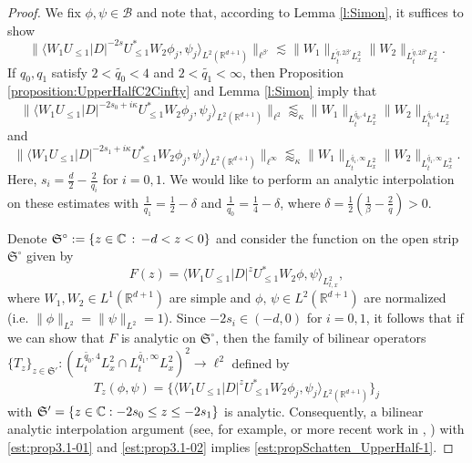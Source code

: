 \documentclass[a4paper]{amsart}
\numberwithin{equation}{section}%
\theoremstyle{plain}%
\theoremstyle{definition}
\theoremstyle{remark}%
\def\Re{\mathfrak{R}}
\newcommand{\R}{{\mathbb R}}
\newcommand{\Co}{{\mathbb C}}
\let\Re\relax
\DeclareMathOperator{\Re}{Re}
\begin{document}
\begin{proof}
We fix $\phi,\psi \in \mathcal{B}$ and note that, according to Lemma \ref{l:Simon}, it suffices to show \begin{equation}\label{est:propSchatten_UpperHalf-1}
\|\langle W_1 U_{\leq 1} |D|^{- 2s} U_{\leq 1}^* W_2 \phi_j,  \psi_j \rangle_{L^2(\R^{d+1})} \|_{\ell^{\beta'}} \lesssim \|W_1 \|_{L_t^{\widetilde{q}, 2\beta'} L_x^2} \|W_2 \|_{L_t^{\widetilde{q}, 2\beta'} L_x^2}.
\end{equation}
If $q_0, q_1$ satisfy $2<\widetilde{q_0}<4$ and $2 < \widetilde{q_1} < \infty$, then
Proposition \ref{proposition:UpperHalfC2Cinfty} and Lemma \ref{l:Simon} imply that
\begin{equation}
\label{est:prop3.1-01}
\|\langle W_1 U_{\leq 1} |D|^{- 2s_0 + i \kappa}  U_{\leq 1}^* W_2 \phi_j,  \psi_j \rangle_{L^2(\R^{d+1})} \|_{\ell^{2}}
\lessapprox_\kappa \|W_1 \|_{L_t^{\widetilde{q_0}, 4} L_x^2} \|W_2 \|_{L_t^{\widetilde{q_0}, 4} L_x^2}
\end{equation}
and
\begin{equation}
\label{est:prop3.1-02}
\|\langle  W_1 U_{\leq 1} |D|^{- 2s_1 + i \kappa}  U_{\leq 1}^* W_2 \phi_j,  \psi_j \rangle_{L^2(\R^{d+1})} \|_{\ell^{\infty}}
\lessapprox_\kappa \|W_1 \|_{L_t^{\widetilde{q_1}, \infty} L_x^2} \|W_2 \|_{L_t^{\widetilde{q_1}, \infty} L_x^2}.
\end{equation}
Here, $s_i =\frac{d}{2}-\frac{2}{q_i}$ for $i = 0,1$. We would like to perform an analytic interpolation on these estimates with $\frac{1}{q_1} = \frac{1}{2} - \delta$ and $\frac{1}{q_0} = \frac{1}{4} - \delta$, where $\delta = \frac{1}{2}(\frac{1}{\beta} - \frac{2}{q}) > 0$.

Denote $\mathfrak{S}^{\circ} := \{z \in \Co \, : \, -d < \Re z < 0\}$  and consider the function on the open strip $\mathfrak S^\circ$ given by
\[
F(z)
=
\langle W_1 U_{\leq 1} |D|^z U_{\leq 1}^* W_2 \phi, \psi \rangle_{L_{t,x}^2},
\]
where 
$W_1, W_2 \in L^1(\R^{d+1})$ are simple and 
$\phi, \, \psi \in L^2(\R^{d+1})$ are normalized (i.e. $\|\phi\|_{L^2} = \|\psi\|_{L^2} =1$). Since $-2s_i \in (-d,0)$ for $i = 0,1$, it follows that if we can show that $F$ is analytic on $\mathfrak S^\circ$, then  
the family of bilinear operators $\{T_z\}_{z \in \mathfrak{S}' } : (L_t^{\widetilde{q_0}, 4} L_x^2 \cap L_t^{\widetilde{q_1}, \infty} L_x^2)^2 \to \ell^2$ defined by
\[
T_z(\phi,\psi) = \{\langle W_1 U_{\leq 1} |D|^{z} U_{\leq 1}^* W_2 \phi_j,  \psi_j \rangle_{L^2(\R^{d+1})} \}_j
\]
with $\mathfrak{S}' = \{z \in \mathbb{C} : -2s_0 \leq \Re z \leq -2s_1 \}$ is analytic. Consequently, a bilinear analytic interpolation argument (see, for example, \cite{CJ} or more recent work in \cite{GM14}, \cite{GO22}) with \eqref{est:prop3.1-01} and \eqref{est:prop3.1-02} implies \eqref{est:propSchatten_UpperHalf-1}.



\end{proof}
\end{document}
